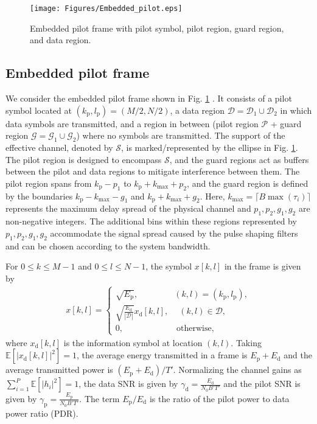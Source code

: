 \vspace{0mm}
\begin{figure}
\hspace{2mm}
\texttt{[image: Figures/Embedded\_pilot.eps]}
\caption{Embedded pilot frame with pilot symbol, pilot region, guard region, and data region.}
\label{fig:embedded_pilot}
\vspace{-5mm}
\end{figure}

\vspace{-4mm}
\subsection{Embedded pilot frame}
We consider the embedded pilot frame shown in Fig. \ref{fig:embedded_pilot} \cite{zak_otfs7}. It consists of a pilot symbol located at $(k_{\text{p}}, l_{\text{p}})=(M/2,N/2)$, a data region $\mathcal{D}=\mathcal{D}_1\cup \mathcal{D}_2$ in which data symbols are transmitted, and a region in between (pilot region $\mathcal{P}$ + guard region $\mathcal{G}=\mathcal{G}_1\cup \mathcal{G}_2$) where no symbols are transmitted. 
The support of the effective channel, denoted by $\mathcal{S}$, is marked/represented by the ellipse in Fig. \ref{fig:embedded_pilot}. The pilot region is designed to encompass $\mathcal{S}$, and the guard regions act as buffers between the pilot and data regions to mitigate interference between them.
The pilot region spans from $k_{\text{p}}-p_1$ to $k_{\text{p}}+k_{\max}+p_2$, and the guard region is defined by the boundaries $k_{\text{p}}-k_{\max}-g_1$ and $k_{\text{p}}+k_{\max}+g_2$. Here, $k_{\max} = \lceil B\max(\tau_{i})  \rceil$ represents the maximum delay spread of the physical channel and $p_1, p_2, g_1, g_2$ are non-negative integers. The additional bins within these regions represented by $p_1, p_2, g_1, g_2$ accommodate the signal spread caused by the pulse shaping filters and can be chosen according to the system bandwidth.  

For $0\leq k\leq M-1$ and $0\leq l\leq N-1$, the symbol $x[k,l]$ in the frame is given by
\begin{eqnarray}
x[k,l]=
\begin{cases}
\sqrt{E_\text{p}}, \quad \quad \quad \quad \ (k,l)=(k_\text{p},l_\text{p}), \\
\sqrt{\frac{E_\text{d}}{|\mathcal{D}|}}x_{\text{d}}[k,l], \quad \ (k,l)\in \mathcal{D}, \\
0, \qquad \qquad \qquad \  \mathrm{otherwise,}
\end{cases}
\label{eqn:noise_integral_closed}
\end{eqnarray}
where $x_\text{d}[k,l]$ is the information symbol at location $(k,l)$. Taking $\mathbb{E}[|x_\text{d}[k,l]|^{2}]=1$, the average energy transmitted in a frame is $E_\text{p}+E_\text{d}$ and the average transmitted power is $(E_\text{p}+E_\text{d})/T'$. Normalizing the channel gains as $\sum_{i=1}^{P}\mathbb{E}[|h_i|^{2}]=1$, the data SNR is given by
$\gamma_{\text{d}}=\frac{E_\text{d}}{N_{0}B'T'}$ and the pilot SNR is given by
$\gamma_{\text{p}}=\frac{E_\text{p}}{N_{0}B'T'}$. The term  $E_{\text{p}}/E_{\text{d}}$ is the ratio of the pilot power to data power ratio (PDR).

